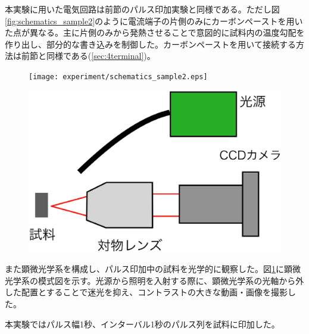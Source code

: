 本実験に用いた電気回路は前節のパルス印加実験と同様である。ただし図\ref{fig:schematics_sample2}のように電流端子の片側のみにカーボンペーストを用いた点が異なる。主に片側のみから発熱させることで意図的に試料内の温度勾配を作り出し、部分的な書き込みを制御した。カーボンペーストを用いて接続する方法は前節と同様である(\ref{sec:4terminal})。
\begin{figure}[!h]
 \begin{minipage}{0.5\hsize}
    \begin{center}
   \texttt{[image: experiment/schematics\_sample2.eps]}
  \end{center}
  \caption{}
  \label{fig:schematics_sample2}
   \end{minipage}
 \begin{minipage}{0.5\hsize}
    \begin{center}
   \includegraphics[width=0.8\hsize]{experiment/microscope.eps}
  \end{center}
  \caption{}
  \label{fig:microscope}
   \end{minipage}
\end{figure}

また顕微光学系を構成し、パルス印加中の試料を光学的に観察した。図\ref{fig:microscope}に顕微光学系の模式図を示す。光源から照明を入射する際に、顕微光学系の光軸から外した配置とすることで迷光を抑え、コントラストの大きな動画・画像を撮影した。


本実験ではパルス幅1秒、インターバル1秒のパルス列を試料に印加した。


\clearpage

